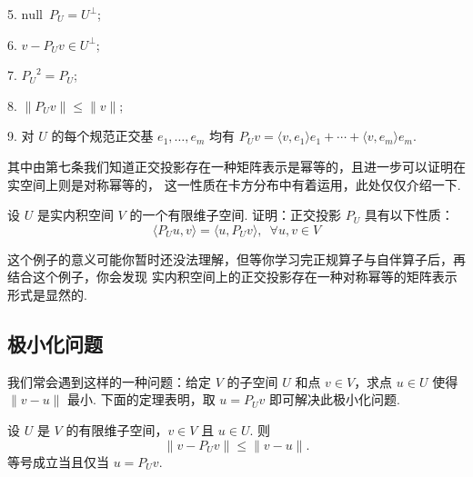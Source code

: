 5. $ \mathrm{null} \enspace P_U = U^{\perp}$;

6. $ v - P_U v \in U^{\perp}$; 

7. $ {P_U}^{2} = P_U$;

8. $ \lVert P_U v\rVert \leqslant \lVert v \rVert $; 

9. 对 $ U $ 的每个规范正交基 $e_1, \ldots , e_m$ 均有 $ P_U v = \langle v, e_1 \rangle e_1 + \cdots + \langle v, e_m \rangle e_m$.

其中由第七条我们知道正交投影存在一种矩阵表示是幂等的，且进一步可以证明在实空间上则是对称幂等的，
这一性质在卡方分布中有着运用，此处仅仅介绍一下. 

\begin{example}
    设 $ U $ 是实内积空间 $ V $ 的一个有限维子空间. 证明：正交投影 $ P_U $ 具有以下性质：
    \[\langle P_U u, v\rangle = \langle u, P_U v\rangle, \enspace \forall u, v \in V \]
\end{example}

这个例子的意义可能你暂时还没法理解，但等你学习完正规算子与自伴算子后，再结合这个例子，你会发现
实内积空间上的正交投影存在一种对称幂等的矩阵表示形式是显然的. 

\subsection{极小化问题}

我们常会遇到这样的一种问题：给定 $ V $ 的子空间 $ U $ 和点 $ v \in V $，求点
$ u \in U $ 使得 $ \lVert v - u \rVert $ 最小. 下面的定理表明，取 $ u = P_U v$
即可解决此极小化问题. 

\begin{theorem}
    设 $ U $ 是 $ V $ 的有限维子空间，$ v \in V $ 且 $ u \in U $. 则
    \[\lVert v - P_U v \rVert \leqslant \lVert v - u \rVert. \]
    等号成立当且仅当 $ u = P_U v $.
\end{theorem}

